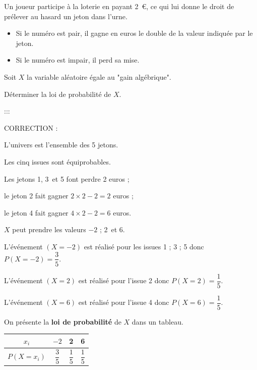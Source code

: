 \documentclass[11pt]{cornouaille}
\begin{document}
Un joueur participe \`{a} la loterie en payant 2~\euro, ce qui lui
donne le droit de pr\'{e}lever au hasard un jeton dans l'urne.

\begin{itemize}
\item Si le num\'{e}ro est pair, il gagne en euros le
double de la valeur indiqu\'{e}e par le jeton.

\item Si le num\'{e}ro est impair, il perd sa mise.
\end{itemize}


Soit $X$ la variable al\'{e}atoire \'{e}gale au "gain
alg\'{e}brique".

D\'{e}terminer la loi de probabilit\'{e} de $X$.



:::




\bigskip

{\color{red}

CORRECTION :


L'univers est l'ensemble des 5 jetons.

Les cinq issues sont \'{e}quiprobables.

Les jetons 1, 3~et 5 font perdre 2 euros ;

le jeton 2 fait gagner $2 \times 2 - 2 = 2$ euros ;

le jeton 4 fait gagner $4 \times 2 - 2 = 6$ euros.

$X$ peut prendre les valeurs $ - 2$ ; 2~et 6.

L'\'{e}v\'{e}nement $\left( {X = - 2} \right)$ est r\'{e}alis\'{e}
pour les issues 1 ; 3 ; 5 donc $P\left( {X = - 2} \right) =
\dfrac{3}{5}$.

L'\'{e}v\'{e}nement $\left( {X = 2} \right)$ est r\'{e}alis\'{e}
pour l'issue 2 donc $P\left( {X = 2} \right) = \dfrac{1}{5}$.

L'\'{e}v\'{e}nement $\left( {X = 6} \right)$ est r\'{e}alis\'{e}
pour l'issue 4 donc $P\left( {X = 6} \right) = \dfrac{1}{5}$.

On pr\'{e}sente la \textbf{loi de probabilit\'{e}} de $X$ dans un
tableau.




\begin{tabular}{|*4{c|}}
\hline
\cellcolor{FondTableaux}
${x_i}$                       & $ - 2$        & 2             & 6             \\      \hline
\cellcolor{FondTableaux}
$P\left( {X = {x_i}} \right)$ & $\dfrac{3}{5}$ & $\dfrac{1}{5}$ & $\dfrac{1}{5}$ \\      \hline
\end{tabular}


}
\end{document}
